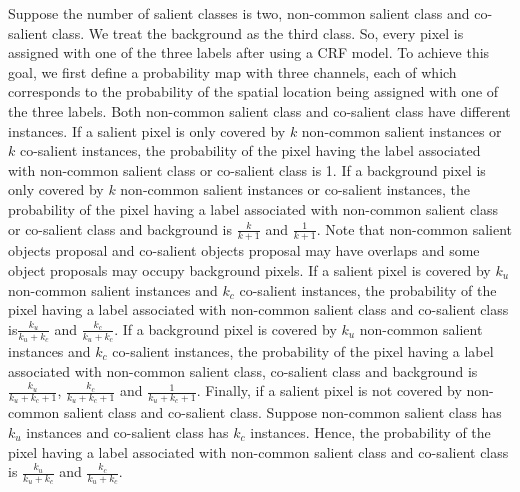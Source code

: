 \documentclass[sigconf]{acmart}
\begin{document}
Suppose the number of salient classes is two, non-common  salient class and co-salient class. We treat the background as the third class. So, every pixel is assigned with one of the three labels after using a CRF model. To achieve this goal, we first define a probability map with three channels, each of which corresponds to the probability of the spatial location being assigned with one of the three labels. Both non-common  salient class and co-salient class have different instances. If a salient pixel is only covered by $k$ non-common  salient instances or $k$ co-salient instances, the probability of the pixel having the label associated with non-common  salient class or co-salient class is 1. If a background pixel is only covered by $k$ non-common  salient instances or co-salient instances, the probability of the pixel having a label associated with non-common  salient class or co-salient class and background is $\frac{k}{k+1}$ and $\frac{1}{k+1}$. Note that non-common  salient objects proposal and co-salient objects proposal may have overlaps and some object proposals may occupy background pixels. If a salient pixel is covered by $k_{u}$ non-common  salient instances and $k_{c}$ co-salient instances, the probability of the pixel having a label associated with non-common  salient class and co-salient class is$\frac{k_u}{k_u+k_c}$ and $\frac{k_c}{k_u+k_c}$. If a background pixel is covered by $k_{u}$ non-common  salient instances and $k_{c}$ co-salient instances, the probability of the pixel having a label associated with non-common  salient class, co-salient class and background is $\frac{k_u}{k_u+k_c+1}$, $\frac{k_c}{k_u+k_c+1}$ and $\frac{1}{k_u+k_c+1}$. Finally, if a salient pixel is not covered by non-common  salient class and co-salient class. Suppose non-common  salient class has $k_{u}$ instances and co-salient class has $k_{c}$ instances. Hence, the probability of the pixel having a label associated with non-common  salient class and co-salient class is $\frac{k_u}{k_u+k_c}$ and $\frac{k_c}{k_u+k_c}$.
\end{document}
